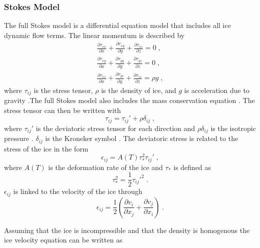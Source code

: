 \documentclass{article}
\begin{document}
\subsubsection{Stokes Model}
The full Stokes model is a differential equation model that includes all ice dynamic flow terms. The linear momentum is described by
\begin{subequations}\label{Stokes}
\begin{gather}
    \frac{\partial \tau_{xx}}{\partial x} + \frac{\partial \tau_{xy}}{\partial y}+ \frac{\partial \tau_{xz}}{\partial z} = 0 \; , \\ 
    \frac{\partial \tau_{xy}}{\partial x} + \frac{\partial \tau_{yy}}{\partial y}+ \frac{\partial \tau_{yz}}{\partial z} = 0 \; , \\ 
    \frac{\partial \tau_{xz}}{\partial x} + \frac{\partial \tau_{yz}}{\partial y}+ \frac{\partial \tau_{zz}}{\partial z} = \rho g \; ,
\end{gather}
\end{subequations}
where $\tau_{ij}$ is the stress tensor, $\rho$ is the density of ice, and $g$ is acceleration due to gravity \citep{LEMEUR2004}.The full Stokes model also includes the mass conservation equation \citep{LEMEUR2004}. The stress tensor can then be written with
\begin{equation}
    \tau_{ij} = \tau_{ij}' + \rho \delta_{ij} \; ,
\end{equation}
where $\tau_{ij}'$ is the deviatoric stress tensor for each direction and $\rho\delta_{ij}$ is the isotropic pressure \citep{LEMEUR2004, soucek2008}. $\delta_{ij}$ is the Kroneker symbol \citep{LEMEUR2004}. The deviatoric stress is related to the stress of the ice in the form
\begin{equation}
    \epsilon_{ij} = A(T)\tau^2_*\tau_{ij}' \; ,
\end{equation}
where $A(T)$ is the deformation rate of the ice and $\tau_*$ is defined as
\begin{equation}
    \tau_*^2 = \frac{1}{2}{\tau_{ij}'}^2 \; .
\end{equation}
$\epsilon_{ij}$ is linked to the velocity of the ice through
\begin{equation}
    \epsilon_{ij} = \frac{1}{2}\left( \frac{\partial v_i}{\partial x_j}+\frac{\partial v_j}{\partial x_i}\right) \; .
\end{equation}

Assuming that the ice is incompressible and that the density is homogenous the ice velocity equation can be written as
\end{document}
